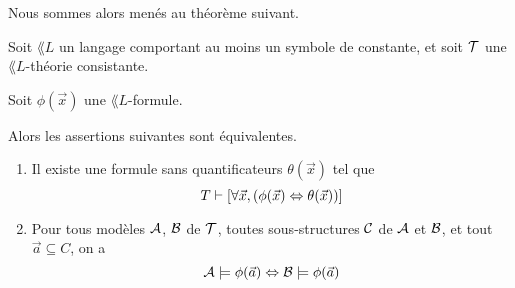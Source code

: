 \documentclass[a4paper, 12pt]{report}
\begin{document}
Nous sommes alors menés au théorème suivant.

\begin{theorem} 
	\label{theorem:critere_eq_formule_par_formule}
	Soit $\lang{L}$ un langage comportant au moins un symbole de constante, et
	soit $\mathcal{T}$ une $\lang{L}$-théorie consistante.

	Soit $\phi(\vec{x})$ une $\lang{L}$-formule.

	Alors les assertions suivantes sont équivalentes.

	\begin{enumerate}
		\item \label{statement:critere_eq_syntaxique} Il existe une formule sans quantificateurs $\theta(\vec{x})$ tel
			que
			\begin{equation}
				T \vdash [\forall \vec{x}, (\phi(\vec{x}) \Leftrightarrow
				\theta(\vec{x}))]
			\end{equation}
		\item \label{statement:critere_eq_semantique} Pour tous modèles $\mathcal{A}$, $\mathcal{B}$ de $\mathcal{T}$,
			toutes sous-structures $\mathcal{C}$ de $\mathcal{A}$ et $\mathcal{B}$,
			et tout $\vec{a} \subseteq C$, on a
			\begin{equation}
				\mathcal{A} \models \phi(\vec{a}) \Leftrightarrow \mathcal{B} \models
				\phi(\vec{a})
			\end{equation}
	\end{enumerate}
\end{theorem}
\end{document}

